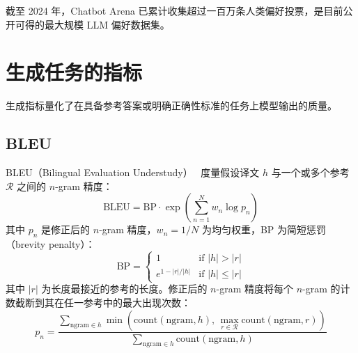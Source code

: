 截至 2024 年，Chatbot Arena 已累计收集超过一百万条人类偏好投票，是目前公开可得的最大规模 LLM 偏好数据集。

\section{生成任务的指标}
\label{subsec:generation-metrics}

生成指标量化了在具备参考答案或明确正确性标准的任务上模型输出的质量。

\subsection{BLEU}
\label{bleu}

BLEU（Bilingual Evaluation Understudy）~\cite{papineni2002bleu} 度量假设译文 $h$ 与一个或多个参考 $\mathcal{R}$ 之间的 $n$-gram 精度：
\begin{equation}
    \text{BLEU} = \text{BP} \cdot \exp\!\left(\sum_{n=1}^{N} w_n \log p_n\right)
\end{equation}
其中 $p_n$ 是修正后的 $n$-gram 精度，$w_n = 1/N$ 为均匀权重，BP 为简短惩罚（brevity penalty）：
\begin{equation}
    \text{BP} = \begin{cases} 1 & \text{if } |h| > |r| \\ e^{1 - |r|/|h|} & \text{if } |h| \leq |r| \end{cases}
\end{equation}
其中 $|r|$ 为长度最接近的参考的长度。修正后的 $n$-gram 精度将每个 $n$-gram 的计数截断到其在任一参考中的最大出现次数：
\begin{equation}
    p_n = \frac{\sum_{\text{ngram} \in h} \min\!\left(\text{count}(\text{ngram}, h),\, \max_{r \in \mathcal{R}} \text{count}(\text{ngram}, r)\right)}{\sum_{\text{ngram} \in h} \text{count}(\text{ngram}, h)}
\end{equation}

